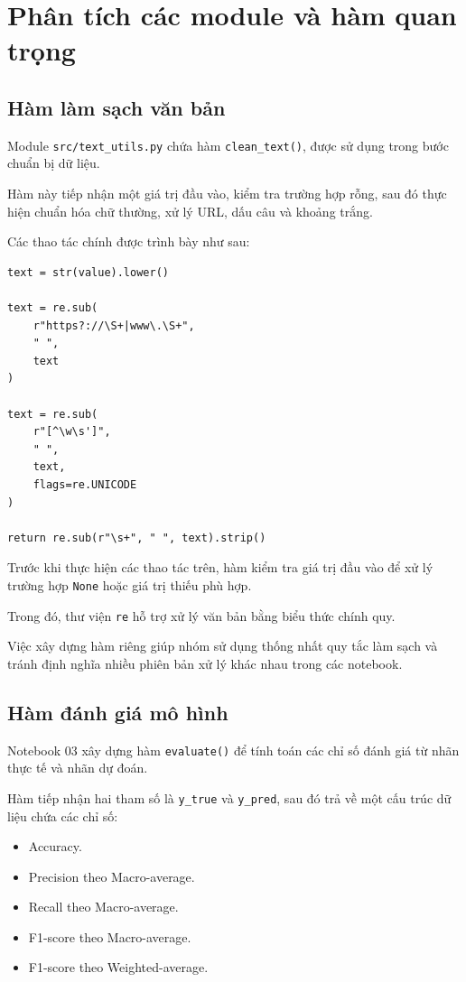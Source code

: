 
\section{Phân tích các module và hàm quan trọng}

\subsection{Hàm làm sạch văn bản}

Module \texttt{src/text\_utils.py} chứa hàm \texttt{clean\_text()}, được sử dụng trong bước chuẩn bị dữ liệu.

Hàm này tiếp nhận một giá trị đầu vào, kiểm tra trường hợp rỗng, sau đó thực hiện chuẩn hóa chữ thường, xử lý URL, dấu câu và khoảng trắng.

Các thao tác chính được trình bày như sau:

\begin{verbatim}
text = str(value).lower()

text = re.sub(
    r"https?://\S+|www\.\S+",
    " ",
    text
)

text = re.sub(
    r"[^\w\s']",
    " ",
    text,
    flags=re.UNICODE
)

return re.sub(r"\s+", " ", text).strip()
\end{verbatim}

Trước khi thực hiện các thao tác trên, hàm kiểm tra giá trị đầu vào để xử lý trường hợp \texttt{None} hoặc giá trị thiếu phù hợp.

Trong đó, thư viện \texttt{re} hỗ trợ xử lý văn bản bằng biểu thức chính quy.

Việc xây dựng hàm riêng giúp nhóm sử dụng thống nhất quy tắc làm sạch và tránh định nghĩa nhiều phiên bản xử lý khác nhau trong các notebook.


\subsection{Hàm đánh giá mô hình}

Notebook 03 xây dựng hàm \texttt{evaluate()} để tính toán các chỉ số đánh giá từ nhãn thực tế và nhãn dự đoán.

Hàm tiếp nhận hai tham số là \texttt{y\_true} và \texttt{y\_pred}, sau đó trả về một cấu trúc dữ liệu chứa các chỉ số:

\begin{itemize}
    \item Accuracy.

    \item Precision theo Macro-average.

    \item Recall theo Macro-average.

    \item F1-score theo Macro-average.

    \item F1-score theo Weighted-average.
\end{itemize}

